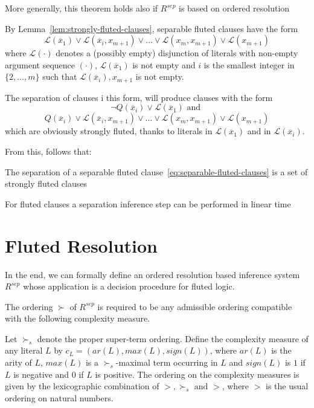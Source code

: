 More generally, this theorem holds also if \(R^{sep}\) is based on ordered resolution

By Lemma~\ref{lem:strongly-fluted-clauses}, separable fluted clauses have the form
\begin{equation}\label{eq:separable-fluted-clauses}
  \mathcal{L}(\overline{x}_1)\lor \mathcal{L}(\overline{x}_i,x_{m+1}) \lor \ldots \lor \mathcal{L}(x_m, x_{m+1}) \lor \mathcal{L}(x_{m+1})
\end{equation}
where \(\mathcal{L}(\cdot)\) denotes a (possibly empty) disjunction of literals with non-empty argument sequence \((\cdot)\), \(\mathcal{L}(\overline{x}_1)\) is not empty and \(i\) is the smallest integer in \(\{2,\ldots, m\}\) such that \(\mathcal{L}(\overline{x}_i), x_{m+1}\) is not empty.

The separation of clauses i this form, will produce clauses with the form
\[
  \neg Q(\overline{x}_i) \lor \mathcal{L}(\overline{x}_1) \text{ and }
\]
\[
  Q(\overline{x}_i) \lor \mathcal{L}(\overline{x}_i,x_{m+1}) \lor \ldots \lor \mathcal{L}(x_m, x_{m+1}) \lor \mathcal{L}(x_{m+1})
\]
which are obviously strongly fluted, thanks to literals in \(\mathcal{L}(\overline{x}_1)\) and in \(\mathcal{L}(\overline{x}_i)\).

From this, follows that:
\begin{lemma}\label{lem:separation-fluted}
  The separation of a separable fluted clause~\ref{eq:separable-fluted-clauses} is a set of strongly fluted clauses
\end{lemma}
\begin{lemma}
  For fluted clauses a separation inference step can be performed in linear time
\end{lemma}


\section{Fluted Resolution}

In the end, we can formally define an ordered resolution based inference system \(R^{sep}\) whose application is a decision procedure for fluted logic.

The ordering \(\succ\) of \(R^{sep}\) is required to be any admissible ordering compatible with the following complexity measure.

\begin{definition}
  Let \(\succ_s\) denote the proper super-term ordering. Define the complexity measure of any literal \(L\) by \(c_L = (ar(L),max(L),sign(L))\), where \(ar(L)\) is the arity of \(L\), \(max(L)\) is a \(\succ_s\)-maximal term occurring in \(L\) and \(sign(L)\) is \(1\) if \(L\) is negative and \(0\) if \(L\) is positive. %
  The ordering on the complexity measures is given by the lexicographic combination of \(>,\succ_s \text{ and } >\), where \(>\) is the usual ordering on natural numbers.
\end{definition}


